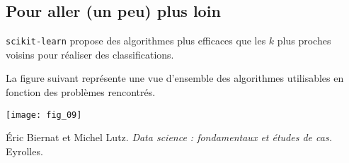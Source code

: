%
%
%
%
%
%
%
%
%
%
%
%
%

\subsection{Pour aller (un peu) plus loin}
\texttt{scikit-learn} propose des algorithmes plus efficaces que les $k$ plus proches voisins pour réaliser des classifications. 

La figure suivant représente une vue d'ensemble des algorithmes utilisables en fonction des problèmes rencontrés. 

\begin{center}
\texttt{[image: fig\_09]}
\end{center}
\begin{thebibliography}{2}
    Éric Biernat et Michel Lutz. {\it Data science : fondamentaux et études de cas.} Eyrolles.
\end{thebibliography}

